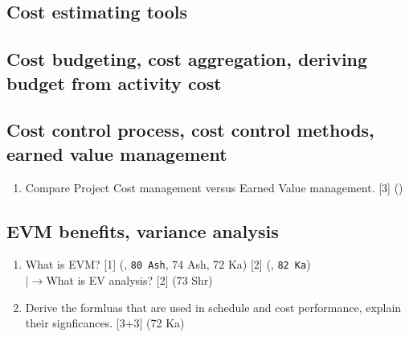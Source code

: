 \documentclass[12pt]{article}
\newcommand{\lb}{\\$\left|\rightarrow\right.$}
\begin{document}
  \subsection{Cost estimating tools}
  \subsection{Cost budgeting, cost aggregation, deriving budget from activity cost}
  \subsection{Cost control process, cost control methods, earned value management}
    \begin{enumerate}
      \item Compare Project Cost management versus Earned Value management. \hfill [3] ()
    \end{enumerate}

  \subsection{EVM benefits, variance analysis}
    \begin{enumerate}
      \item What is EVM? \hfill [1] (, \texttt{80 Ash}, 74 Ash, 72 Ka) [2] (, \texttt{82 Ka})
        \lb What is EV analysis? \hfill [2] (73 Shr)
      
      \item Derive the formluas that are used in schedule and cost performance, explain their signficances. \hfill [3+3] (72 Ka)
    \end{enumerate}
\end{document}
